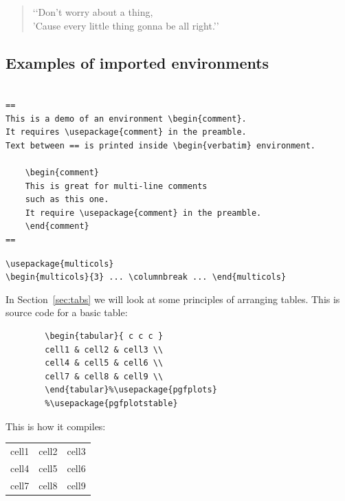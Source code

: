 \documentclass[a4paper,11pt]{article}
\begin{document}
\begin{quote}
	\lq\lq Don't worry about a thing,\\
	'Cause every little thing gonna be all right.\rq\rq
\end{quote}

\subsection{Examples of imported environments}


\begin{verbatim}

==
This is a demo of an environment \begin{comment}. 
It requires \usepackage{comment} in the preamble. 
Text between == is printed inside \begin{verbatim} environment.

	\begin{comment}
	This is great for multi-line comments 
	such as this one.
	It require \usepackage{comment} in the preamble.
	\end{comment}
==
\end{verbatim}

\verb|\usepackage{multicols}| \\
\verb|\begin{multicols}{3} ... \columnbreak ... \end{multicols}|

\begin{multicols}{3} %
	\clearpage\maketitle
	\thispagestyle{empty}
	
	In Section~\ref{sec:tabs} we will look at some principles of arranging tables.
	\usetikzlibrary{calc, positioning, shapes.arrows}
	\columnbreak 
	This is source code for a basic table:
	\begin{verbatim}
		\begin{tabular}{ c c c } 
		cell1 & cell2 & cell3 \\ 
		cell4 & cell5 & cell6 \\ 
		cell7 & cell8 & cell9 \\ 
		\end{tabular}%\usepackage{pgfplots}
		%\usepackage{pgfplotstable}
	\end{verbatim}

	
	\columnbreak
	This is how it compiles:
	\begin{tabular}{ c c c } 
		cell1 & cell2 & cell3 \\ \usetikzlibrary{calc, positioning, shapes.arrows}
		cell4 & cell5 & cell6 \\ 
		cell7 & cell8 & cell9 \\ 
	\end{tabular}
	\setlength\fboxsep{3pt} %
	\setlength\fboxrule{1pt} %
\end{multicols}
\end{document}
